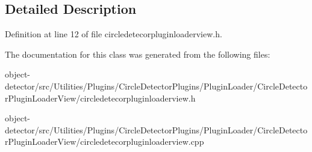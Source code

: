 \subsection{Detailed Description}


Definition at line 12 of file circledetecorpluginloaderview.\+h.



The documentation for this class was generated from the following files\+:\begin{DoxyCompactItemize}
\item 
object-\/detector/src/\+Utilities/\+Plugins/\+Circle\+Detector\+Plugins/\+Plugin\+Loader/\+Circle\+Detector\+Plugin\+Loader\+View/circledetecorpluginloaderview.\+h\item 
object-\/detector/src/\+Utilities/\+Plugins/\+Circle\+Detector\+Plugins/\+Plugin\+Loader/\+Circle\+Detector\+Plugin\+Loader\+View/circledetecorpluginloaderview.\+cpp\end{DoxyCompactItemize}
